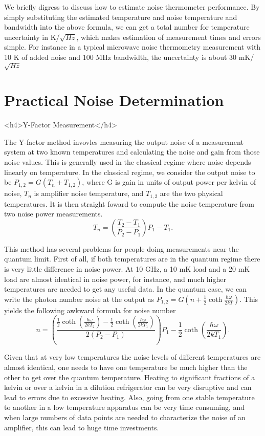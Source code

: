 \documentclass[11pt]{article}
\begin{document}
    We briefly digress to discuss how to estimate noise thermometer performance.  By simply substituting the estimated temperature and noise temperature and bandwidth into the above formula, we can get a total number for temperature uncertainty in K/$\sqrt{Hz}$, which makes estimation of measurement times and errors simple.  For instance in a typical microwave noise thermometry measurement with 10 K of added noise and 100 MHz bandwidth, the uncertainty is about 30 mK/$\sqrt{Hz}$



\section{
Practical Noise Determination}
	<h4>Y-Factor Measurement</h4>



	The Y-factor method invovles measuring the output noise of a measurement system at two known temperatures and calculating the noise and gain from those noise values.  This is generally used in the classical regime where noise depends linearly on temperature.  In the classical regime, we consider the output noise to be $P_{1,2} = G(T_n + T_{1,2})$, where G is gain in units of output power per kelvin of noise, $T_n$ is amplifier noise temperature, and $T_{1,2}$ are the two physical temperatures.  It is then straight foward to compute the noise temperature from two noise power measurements.  
$$T_n = \left(\frac{T_2 - T_1}{P_2 - P_1}\right)P_1 - T_1.$$

	This method has several problems for people doing measurements near the quantum limit.  First of all, if both temperatures are in the quantum regime there is very little difference in noise power.  At 10 GHz, a 10 mK load and a 20 mK load are almost identical in noise power, for instance, and much higher temperatures are needed to get any useful data.  In the quantum case, we can write the photon number noise at the output as $P_{1,2} = G(n + \frac{1}{2}\coth{\frac{\hbar\omega}{2kT}})$.  This yields the following awkward formula for noise number
$$n = \left(\frac{\frac{1}{2}\coth{\left(\frac{\hbar\omega}{2kT_2}\right)} - \frac{1}{2}\coth{\left(\frac{\hbar\omega}{2kT_1}\right)}}{2(P_2 - P_1)}\right)P_1 - \frac{1}{2}\coth{\left(\frac{\hbar\omega}{2kT_1}\right)}.$$



	Given that at very low temperatures the noise levels of different temperatures are almost identical, one needs to have one temperature be much higher than the other to get over the quantum temperature.  Heating to significant fractions of a kelvin or over a kelvin in a dilution refrigerator can be very disruptive and can lead to errors due to excessive heating.  Also, going from one stable temperature to another in a low temperature apparatus can be very time consuming, and when large numbers of data points are needed to characterize the noise of an amplifier, this can lead to huge time investments.  
\end{document}
